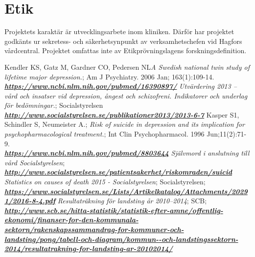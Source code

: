\documentclass[12pt,a4paper,oneside]{article}
\begin{document}
\section*{Etik}
Projektets karakt{\"a}r {\"a}r utvecklingsarbete inom kliniken. D{\"a}rf{\"o}r har projektet godk{\"a}nts ur sekretess- och s{\"a}kerhetsynpunkt av verksamhetschefen vid Hagfors v{\aa}rdcentral. Projektet omfattas inte av Etikpr{\"o}vningslagens forskningsdefinition.

\begin{thebibliography}{11}
Kendler KS, Gatz M, Gardner CO, Pedersen NL\emph{A Swedish national twin study of lifetime major depression.}; Am J Psychiatry. 2006 Jan; 163(1):109-14.\\\textbf{\emph{\href{https://www.ncbi.nlm.nih.gov/pubmed/16390897/}{\url{https://www.ncbi.nlm.nih.gov/pubmed/16390897/}}}}
 \emph{Utv{\"a}rdering 2013 -- v\r{a}rd och insatser vid depression, \r{a}ngest och schizofreni. Indikatorer och underlag f{\"o}r bed{\"o}mningar.}; Socialstyrelsen\\\textbf{\emph{\href{http://www.socialstyrelsen.se/publikationer2013/2013-6-7}{\url{http://www.socialstyrelsen.se/publikationer2013/2013-6-7}}}}
 Kasper S1, Schindler S, Neumeister A.; \emph{Risk of suicide in depression and its implication for psychopharmacological treatment.}; Int Clin Psychopharmacol. 1996 Jun;11(2):71-9.\\\textbf{\emph{\href{https://www.ncbi.nlm.nih.gov/pubmed/8803644}{\url{https://www.ncbi.nlm.nih.gov/pubmed/8803644}}}}
 \emph{Sj{\"a}lvmord i anslutning till v\r{a}rd Socialstyrelsen};\\\textbf{\emph{\href{http://www.socialstyrelsen.se/patientsakerhet/riskomraden/suicid}{\url{http://www.socialstyrelsen.se/patientsakerhet/riskomraden/suicid
}}}}
\emph{Statistics on causes of death 2015 - Socialstyrelsen}; Socialstyrelsen;
\\\textbf{\emph{\href{https://www.socialstyrelsen.se/Lists/Artikelkatalog/Attachments/20291/2016-8-4.pdf}{\url{
https://www.socialstyrelsen.se/Lists/Artikelkatalog/Attachments/20291/2016-8-4.pdf}}}}
 \emph{Resultatr{\"a}kning f{\"o}r landsting \r{a}r 2010--2014}; SCB;\\\textbf{\emph{\href{ http://www.scb.se/hitta-statistik/statistik-efter-amne/offentlig-ekonomi/finanser-for-den-kommunala-sektorn/rakenskapssammandrag-for-kommuner-och-landsting/pong/tabell-och-diagram/kommun--och-landstingssektorn-2014/resultatrakning-for-landsting-ar-20102014/}{\url{http://www.scb.se/hitta-statistik/statistik-efter-amne/offentlig-ekonomi/finanser-for-den-kommunala-sektorn/rakenskapssammandrag-for-kommuner-och-landsting/pong/tabell-och-diagram/kommun--och-landstingssektorn-2014/resultatrakning-for-landsting-ar-20102014/}}}}

\end{thebibliography}
\end{document}
